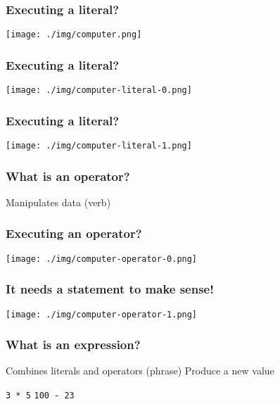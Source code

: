 \documentclass[11pt]{beamer}
\begin{document}
\begin{frame}
  \frametitle{Executing a literal?}
  \texttt{[image: ./img/computer.png]}
\end{frame}

\begin{frame}
  \frametitle{Executing a literal?}
  \texttt{[image: ./img/computer-literal-0.png]}
\end{frame}

\begin{frame}
  \frametitle{Executing a literal?}
  \texttt{[image: ./img/computer-literal-1.png]}
\end{frame}

\begin{frame}
  \frametitle{What is an \textbf{operator}?}
  \Enlarge

  \begin{itemize}
  \myitem  Manipulates data (verb)
  \end{itemize}
\end{frame}

\begin{frame}
  \frametitle{Executing an operator?}
  \texttt{[image: ./img/computer-operator-0.png]}
\end{frame}

\begin{frame}
  \frametitle{It needs a statement to make sense!}
  \texttt{[image: ./img/computer-operator-1.png]}
\end{frame}

\begin{frame}
  \frametitle{What is an \textbf{expression}?}
  \Enlarge

  \begin{itemize}
  \myitem  Combines literals and operators (phrase) \pause
  \myitem  Produce a new value
    \begin{itemize}
    \mysubitem  \texttt{3 * 5}
    \mysubitem  \texttt{100 - 23}
    \end{itemize}
  \end{itemize}
\end{frame}
\end{document}
